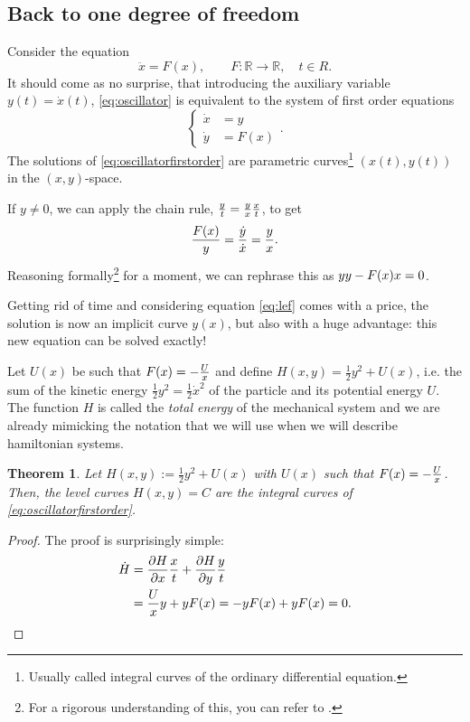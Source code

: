 \documentclass[english,fontsize=11pt,paper=a5,oneside]{scrbook}
\newcommand{\R}{\mathbb{R}}
\let\d\relax
\DeclareMathOperator{\d}{d}
\newtheorem{theorem}{Theorem}[chapter]
\theoremstyle{definition}
\begin{document}
\subsection{Back to one degree of freedom}\label{sec:bdf}

Consider the equation
\begin{equation}\label{eq:oscillator}
    \ddot x = F(x), \qquad F:\R\to\R, \quad t\in R.
\end{equation}
It should come as no surprise, that introducing the auxiliary variable $y(t) = \dot x(t)$, \eqref{eq:oscillator} is equivalent to the system of first order equations
\begin{equation}\label{eq:oscillatorfirstorder}
    \left\lbrace
    \begin{aligned}
        \dot x &= y \\
        \dot y &= F(x)
    \end{aligned}
    \right..
\end{equation}
The solutions of \eqref{eq:oscillatorfirstorder} are parametric curves\footnote{Usually called integral curves of the ordinary differential equation.} $(x(t),y(t))$ in the $(x,y)$-space.

If $y\neq0$, we can apply the chain rule, $\frac{\d y}{\d t} = \frac{\d y}{\d x} \frac{\d x}{\d t}$, to get
\begin{equation}\label{eq:lef}
    \frac{F(x)}y = \frac{\dot y}{\dot x} = \frac{\d y}{\d x}.
\end{equation}
Reasoning formally\footnote{For a rigorous understanding of this, you can refer to \cite[Equation (5.1) with $f=y$ and Remark 5.1.3]{lectures:aom:seri}.} for a moment, we can rephrase this as $y \d y - F(x) \d x = 0$.

Getting rid of time and considering equation \eqref{eq:lef} comes with a price, the solution is now an implicit curve $y(x)$, but also with a huge advantage: this new equation can be solved exactly!

Let $U(x)$ be such that $F(x) = -\frac{\d U}{\d x}$ and define $H(x, y) = \frac12 y^2 + U(x)$, i.e. the sum of the kinetic energy $\frac12 y^2 = \frac12 {\dot x}^2$ of the particle and its potential energy $U$.
The function $H$ is called the \emph{total energy} of the mechanical system and we are already mimicking the notation that we will use when we will describe hamiltonian systems.

\begin{theorem}\label{thm:ham1}
    Let $H(x, y) := \frac12 y^2 + U(x)$ with $U(x)$ such that $F(x) = -\frac{\d U}{\d x}$.
    Then, the level curves $H(x,y) = C$ are the integral curves of \eqref{eq:oscillatorfirstorder}.
\end{theorem}
\begin{proof}
The proof is surprisingly simple:
\begin{align*}
    \dot H &= \frac{\partial H}{\partial x}\frac{\d x}{\d t} + \frac{\partial H}{\partial y}\frac{\d y}{\d t} \\
    & = \frac{\d U}{\d x} y + y F(x)
    = -y F(x) + y F(x) = 0.
\end{align*}
\end{proof}
\end{document}
